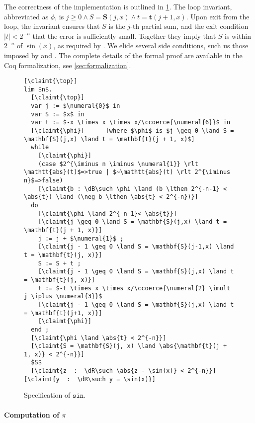 The correctness of the implementation is outlined in \cref{fig:sin-correct}.
%
The loop invariant, abbreviated as $\phi$, is
%
$j \geq 0 \land S = \mathbf{S}(j, x) \land t = \mathbf{t}(j + 1, x)$.
%
Upon exit from the loop, the invariant ensures that $S$ is the $j$-th partial sum, and the exit condition $|t| < 2^{-n}$ that the error is sufficiently small. Together they imply that $S$ is within $2^{-n}$ of $\sin(x)$, as required by .
%
We elide several side conditions, such us those imposed by  and .
%
The complete details of the formal proof are available in the Coq formalization, see \cref{sec:formalization}.

\begin{figure}[htb]
  \centering
  \begin{mdframed}
  \small
\begin{lstlisting}
[\claimt{\top}]
lim $n$.
  [\claimt{\top}]
  var j := $\numeral{0}$ in
  var S := $x$ in
  var t := $-x \times x \times x/\ccoerce{\numeral{6}}$ in
  [\claimt{\phi}]      [where $\phi$ is $j \geq 0 \land S = \mathbf{S}(j,x) \land t = \mathbf{t}(j + 1, x)$]
  while
    [\claimt{\phi}]
    (case $2^{\iminus n \iminus \numeral{1}} \rlt \mathtt{abs}(t)$=>true | $~\mathtt{abs}(t) \rlt 2^{\iminus n}$=>false)
    [\claimt{b : \dB\such \phi \land (b \lthen 2^{-n-1} < \abs{t}) \land (\neg b \lthen \abs{t} < 2^{-n})}]
  do
    [\claimt{\phi \land 2^{-n-1}< \abs{t}}]
    [\claimt{j \geq 0 \land S = \mathbf{S}(j,x) \land t = \mathbf{t}(j + 1, x)}]
    j := j + $\numeral{1}$ ;
    [\claimt{j - 1 \geq 0 \land S = \mathbf{S}(j-1,x) \land t = \mathbf{t}(j, x)}]
    S := S + t ;
    [\claimt{j - 1 \geq 0 \land S = \mathbf{S}(j,x) \land t = \mathbf{t}(j, x)}]
    t := $-t \times x \times x/\ccoerce{\numeral{2} \imult j \iplus \numeral{3}}$
    [\claimt{j - 1 \geq 0 \land S = \mathbf{S}(j,x) \land t = \mathbf{t}(j+1, x)}]
    [\claimt{\phi}]
  end ;
  [\claimt{\phi \land \abs{t} < 2^{-n}}]
  [\claimt{S = \mathbf{S}(j, x) \land \abs{\mathbf{t}(j + 1, x)} < 2^{-n}}]
  $S$
  [\claimt{z  :  \dR\such \abs{z - \sin(x)} < 2^{-n}}]
[\claimt{y  :  \dR\such y = \sin(x)}]
\end{lstlisting}
  \end{mdframed}
  \caption{Specification of $\mathtt{sin}$.}
  \label{fig:sin-correct}
\end{figure}


\paragraph*{Computation of $\pi$}


